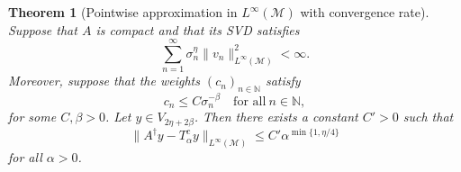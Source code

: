 \documentclass{article}
\newtheorem{theorem}{Theorem}[section]
\theoremstyle{definition}
\newcommand{\N}{\mathbb{N}}
\newcommand{\smallnorm}[1]{\lVert#1\rVert}
\newcommand{\pseudoinv}[1]{{#1}^\dagger}
\begin{document}
\begin{theorem}[Pointwise approximation in \(L^\infty(\mathcal{M})\) with convergence rate]
\label{thm:spectralfilter_pwlinfapprox_rate}
    Suppose that
    \(A\) is compact and that its SVD satisfies
    \begin{equation}\label{eq:spectralrelativegrowth2}
        \sum_{n=1}^\infty
        \sigma_n^{\eta} \smallnorm{v_n}_{L^\infty(\mathcal{M})}^2
        <\infty.
    \end{equation}
    Moreover, suppose that the weights \((c_n)_{n\in\N}\) satisfy
    \begin{equation*}
        c_n \leq C \sigma_n^{-\beta}\quad\text{for all}\ n\in\N,
    \end{equation*}
    for some \(C, \beta>0\).
    Let \(y\in V_{2\eta+2\beta}\).
    Then there exists a constant \(C'>0\)
    such that
    \begin{equation*}
    \smallnorm{\pseudoinv{A} y - T^c_\alpha y}_{L^\infty(\mathcal{M})}
        \leq 
        C' \alpha^{\min\{1,\eta/4\}}
    \end{equation*}
    for all \(\alpha>0\).
\end{theorem}
\end{document}
